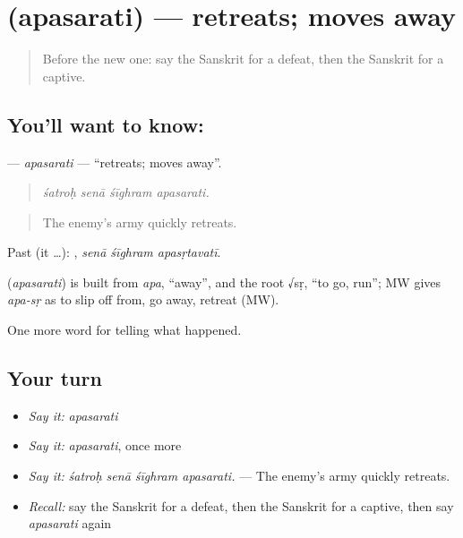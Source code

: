 \section[\texorpdfstring{\sk{अपसरति} (apasarati)}{अपसरति (apasarati)}]{ (apasarati) — retreats; moves away}

\label{lesson:SA-C319-apasarati}



\begin{quote}
Before the new one: say the Sanskrit for a defeat, then the Sanskrit for a captive.
\end{quote}

\subsection*{You'll want to know: }
\textbf{} — \emph{apasarati} — \textquotedblleft{}retreats; moves away\textquotedblright{}.

\begin{quote}
   
\end{quote}

\begin{quote}
\emph{śatroḥ senā śīghram apasarati.}
\end{quote}

\begin{quote}
The enemy's army quickly retreats.
\end{quote}

Past (it …):   , \emph{senā śīghram apasṛtavatī}.

\begin{cousinweb}
\textbf{} (\emph{apasarati}) is built from \emph{apa}, \textquotedblleft{}away\textquotedblright{}, and the root √sṛ, \textquotedblleft{}to go, run\textquotedblright{}; MW gives \emph{apa-sṛ} as to slip off from, go away, retreat (MW).
\end{cousinweb}

\begin{grammarlens}[title={What you've built}]
One more word for telling what happened.
\end{grammarlens}

\subsection*{Your turn}
\begin{itemize}
\raggedright
  \item \emph{Say it:} \emph{apasarati}
  \item \emph{Say it:} \emph{apasarati}, once more
  \item \emph{Say it:} \emph{śatroḥ senā śīghram apasarati.} — The enemy's army quickly retreats.
  \item \emph{Recall:} say the Sanskrit for a defeat, then the Sanskrit for a captive, then say \emph{apasarati} again
\end{itemize}

